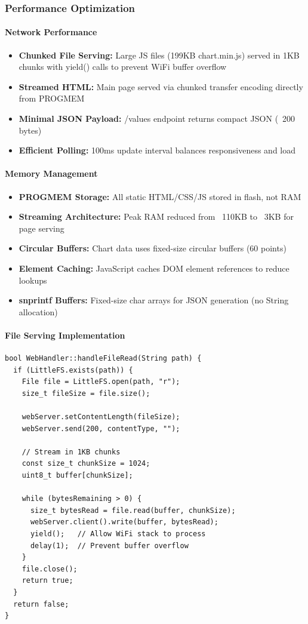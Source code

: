 \documentclass[12pt,a4paper]{article}
\begin{document}
\subsubsection{Performance Optimization}

\paragraph{Network Performance}
\begin{itemize}
    \item \textbf{Chunked File Serving:} Large JS files (199KB chart.min.js) served in 1KB chunks with yield() calls to prevent WiFi buffer overflow
    \item \textbf{Streamed HTML:} Main page served via chunked transfer encoding directly from PROGMEM
    \item \textbf{Minimal JSON Payload:} /values endpoint returns compact JSON (~200 bytes)
    \item \textbf{Efficient Polling:} 100ms update interval balances responsiveness and load
\end{itemize}

\paragraph{Memory Management}
\begin{itemize}
    \item \textbf{PROGMEM Storage:} All static HTML/CSS/JS stored in flash, not RAM
    \item \textbf{Streaming Architecture:} Peak RAM reduced from ~110KB to ~3KB for page serving
    \item \textbf{Circular Buffers:} Chart data uses fixed-size circular buffers (60 points)
    \item \textbf{Element Caching:} JavaScript caches DOM element references to reduce lookups
    \item \textbf{snprintf Buffers:} Fixed-size char arrays for JSON generation (no String allocation)
\end{itemize}

\paragraph{File Serving Implementation}
\begin{lstlisting}[caption=Chunked File Serving for Large Assets]
bool WebHandler::handleFileRead(String path) {
  if (LittleFS.exists(path)) {
    File file = LittleFS.open(path, "r");
    size_t fileSize = file.size();
    
    webServer.setContentLength(fileSize);
    webServer.send(200, contentType, "");
    
    // Stream in 1KB chunks
    const size_t chunkSize = 1024;
    uint8_t buffer[chunkSize];
    
    while (bytesRemaining > 0) {
      size_t bytesRead = file.read(buffer, chunkSize);
      webServer.client().write(buffer, bytesRead);
      yield();   // Allow WiFi stack to process
      delay(1);  // Prevent buffer overflow
    }
    file.close();
    return true;
  }
  return false;
}
\end{lstlisting}
\end{document}
